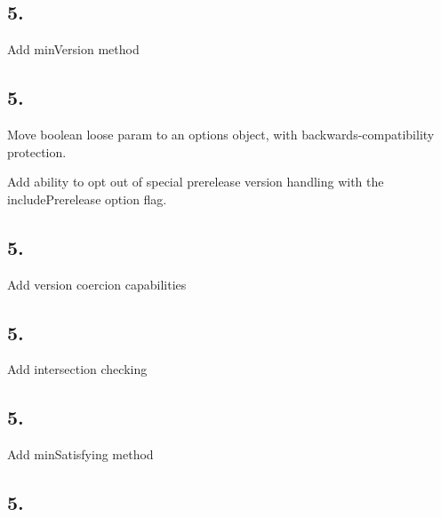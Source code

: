 \subsection*{5.}


\begin{DoxyItemize}
\item Add {\ttfamily min\+Version} method
\end{DoxyItemize}

\subsection*{5.}


\begin{DoxyItemize}
\item Move boolean {\ttfamily loose} param to an options object, with backwards-\/compatibility protection.
\item Add ability to opt out of special prerelease version handling with the {\ttfamily include\+Prerelease} option flag.
\end{DoxyItemize}

\subsection*{5.}


\begin{DoxyItemize}
\item Add version coercion capabilities
\end{DoxyItemize}

\subsection*{5.}


\begin{DoxyItemize}
\item Add intersection checking
\end{DoxyItemize}

\subsection*{5.}


\begin{DoxyItemize}
\item Add {\ttfamily min\+Satisfying} method
\end{DoxyItemize}

\subsection*{5.}


